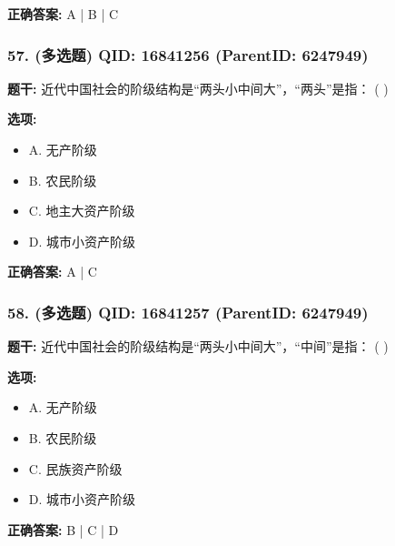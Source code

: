 \documentclass[12pt,UTF8]{ctexart}
\begin{document}
\textbf{正确答案:}
A | B | C

\vspace{0.3em}\hrulefill\vspace{0.7em}

\subsubsection*{57. (多选题) \small QID: 16841256 (ParentID: 6247949)}

\textbf{题干:}
近代中国社会的阶级结构是“两头小中间大”，“两头”是指： ( )



\textbf{选项:}
\begin{itemize}[leftmargin=*]

  \item A. 无产阶级

  \item B. 农民阶级

  \item C. 地主大资产阶级

  \item D. 城市小资产阶级

\end{itemize}

\textbf{正确答案:}
A | C

\vspace{0.3em}\hrulefill\vspace{0.7em}

\subsubsection*{58. (多选题) \small QID: 16841257 (ParentID: 6247949)}

\textbf{题干:}
近代中国社会的阶级结构是“两头小中间大”，“中间”是指： ( )



\textbf{选项:}
\begin{itemize}[leftmargin=*]

  \item A. 无产阶级

  \item B. 农民阶级

  \item C. 民族资产阶级

  \item D. 城市小资产阶级

\end{itemize}

\textbf{正确答案:}
B | C | D
\end{document}
